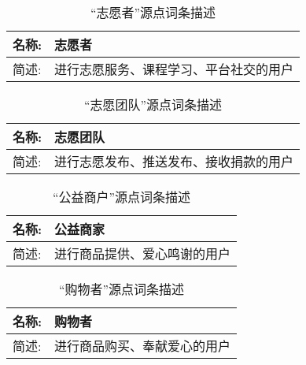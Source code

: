 \begin{table}[H]
  \begin{center}
    \caption{“志愿者”源点词条描述}
    \begin{tabular}{l p{11cm}} 
      \hline
      名称: & 志愿者\\
      \hline
      简述:& 进行志愿服务、课程学习、平台社交的用户\\
      \hline
    \end{tabular}
    \label{tab_volunteer}
  \end{center}
\end{table}


\begin{table}[H]
  \begin{center}
    \caption{“志愿团队”源点词条描述}
    \begin{tabular}{l p{11cm}} 
      \hline
      名称: & 志愿团队\\
      \hline
      简述:& 进行志愿发布、推送发布、接收捐款的用户\\
      \hline
    \end{tabular}
  \end{center}
\end{table}


\begin{table}[H]
  \begin{center}
    \caption{“公益商户”源点词条描述}
    \begin{tabular}{l p{11cm}} 
      \hline
      名称: & 公益商家\\
      \hline
      简述: & 进行商品提供、爱心鸣谢的用户\\
      \hline
    \end{tabular}
  \end{center}
\end{table}


\begin{table}[H]
  \begin{center}
    \caption{“购物者”源点词条描述}
    \begin{tabular}{l p{11cm}} 
      \hline
      名称: & 购物者\\
      \hline
      简述: & 进行商品购买、奉献爱心的用户\\
      \hline
    \end{tabular}
  \end{center}
\end{table}


